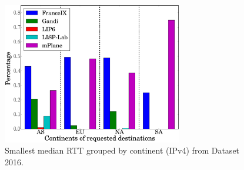 \begin{figure}[!t]
	\centering
	\includegraphics[width=0.7\textwidth]{Pics/v4/Smallest_median_avg(RTT)_proporation.eps}
	\caption{Smallest median RTT grouped by continent (IPv4) from Dataset 2016.}
	\label{Smallest_median_avg(RTT)_proporation_v4_2016}
\end{figure}

